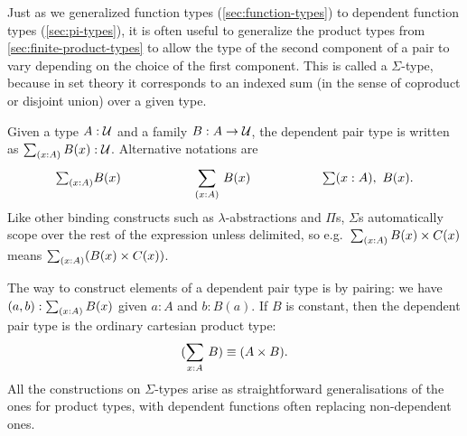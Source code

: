 Just as we generalized function types (\autoref{sec:function-types}) to dependent function types (\autoref{sec:pi-types}), it is often useful to generalize the product types from \autoref{sec:finite-product-types} to allow the type of
the second component of a pair to vary depending on the choice of the first
component. This is called a $\Sigma$-type, because in set theory it
corresponds to an indexed sum (in the sense of coproduct or
disjoint union) over a given type.

%
%
%
%
%
Given a type $A:\mathcal{U}$ and a family $B : A \to \mathcal{U}$, the dependent
pair type is written as $\sm{x:A} B(x) : \UU$.
Alternative notations are 
\[ \tsm{x:A} B(x) \hspace{2cm} \dsm{x:A}B(x) \hspace{2cm} \lsm{x:A} B(x). \]
Like other binding constructs such as $\lambda$-abstractions and $\Pi$s, $\Sigma$s automatically scope over the rest of the expression unless delimited, so e.g.\ $\sm{x:A} B(x) \times C(x)$ means $\sm{x:A} (B(x) \times C(x))$.

%
%
The way to construct elements of a dependent pair type is by pairing: we have
$\tup{a}{b} : \sm{x:A} B(x)$ given $a:A$ and $b:B(a)$.
If $B$ is constant, then the dependent pair type is the
ordinary cartesian product type:
\[ (\sm{x:A} B) \jdeq (A \times B).\]
All the constructions on $\Sigma$-types arise as straightforward generalisations of the ones for product types, with dependent functions often replacing non-dependent ones.


